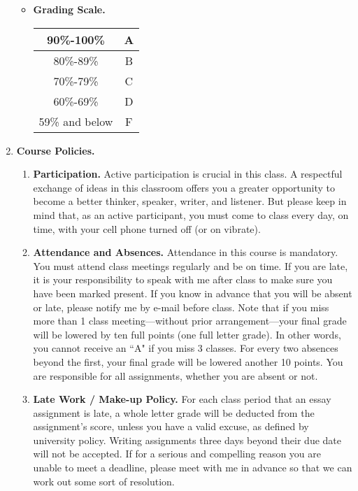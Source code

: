 \documentclass[9pt]{article}
\begin{document}
\begin{enumerate}
\begin{itemize}
         \item \textbf{Grading Scale.} 
         \begin{center}
            \begin{tabular}{@{}|c|c|@{}} \hline
               90\%-100\% & A \\ \hline
               80\%-89\% & B \\ \hline
               70\%-79\% & C \\ \hline
               60\%-69\% & D \\ \hline
               59\% and below & F \\ \hline
            \end{tabular}
         \end{center}
         \end{itemize}
   \item \textbf{Course Policies.}
         \begin{enumerate}
         \item \textbf{Participation.} Active participation is crucial in this class.
         A respectful exchange of ideas in this classroom offers you a
         greater opportunity to become a better thinker, speaker, writer, and
         listener. But please keep in mind that, as an active participant, you
         must come to class every day, on time, with your cell phone turned off (or on
         vibrate).
   \item \textbf{Attendance and Absences.} Attendance in this course is
         mandatory. You must attend class meetings regularly and be on time. If
         you are late, it is your responsibility to speak with me after class
         to make sure you have been marked present. If you know in advance that
         you will be absent or late, please notify me by e-mail before class.
         Note that if you miss more than 1 class meeting---without prior
         arrangement---your final grade will be lowered by ten full points (one
         full letter grade). In other words, you cannot receive an ``A" if you
         miss 3 classes. For every two absences beyond the first, your final
         grade will be lowered another 10 points. You are responsible for all
         assignments, whether you are absent or not.
         
   \item \textbf{Late Work / Make-up Policy.} For each class period that an essay
         assignment is late, a whole letter grade will be deducted from the
         assignment's score, unless you have a valid excuse, as defined by
         university policy. Writing assignments three days beyond their due date
         will not be accepted. If for a serious and compelling reason you are
         unable to meet a deadline, please meet with me in advance so that we
         can work out some sort of resolution.
         

\end{enumerate}
\end{enumerate}
\end{document}
